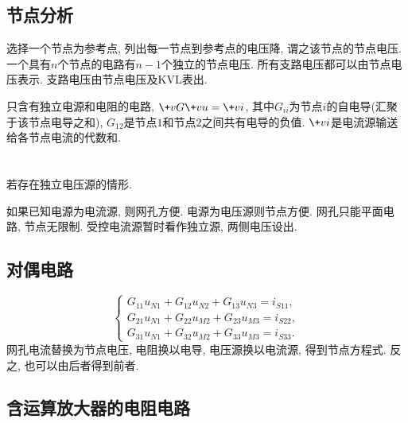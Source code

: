 \documentclass{ctexart}
\begin{document}


\subsection{节点分析} %
\label{sub:节点分析}

选择一个节点为参考点, 列出每一节点到参考点的电压降, 谓之该节点的节点电压. 一个具有$n$个节点的电路有$n-1$个独立的节点电压. 所有支路电压都可以由节点电压表示. 支路电压由节点电压及KVL表出.
\par
只含有独立电源和电阻的电路, $\+vG \+vu = \+vi$, 其中$G_{ii}$为节点$i$的自电导(汇聚于该节点电导之和), $G_{12}$是节点$1$和节点$2$之间共有电导的{\color{red}负值}. $\+vi$是电流源输送给各节点电流的代数和.\\
\\
\\
若存在独立电压源的情形.
\par
如果已知电源为电流源, 则网孔方便. 电源为电压源则节点方便. 网孔只能平面电路, 节点无限制. 受控电流源暂时看作独立源, 两侧电压设出.


\subsection{对偶电路} %
\label{sub:对偶电路}

\[ \begin{cases}
    G_{11} u_{N1} +  G_{12}u_{N2} + G_{13} u_{N3} = i_{S11},\\
    G_{21} u_{N1} +  G_{22}u_{M2} + G_{23} u_{M3} = i_{S22}, \\
    G_{31} u_{N1} +  G_{32}u_{M2} + G_{33} u_{M3} = i_{S33}.
\end{cases} \]
网孔电流替换为节点电压, 电阻换以电导, 电压源换以电流源, 得到节点方程式. 反之, 也可以由后者得到前者.


\subsection{含运算放大器的电阻电路} %
\label{sub:含运算放大器的电阻电路}
\end{document}
